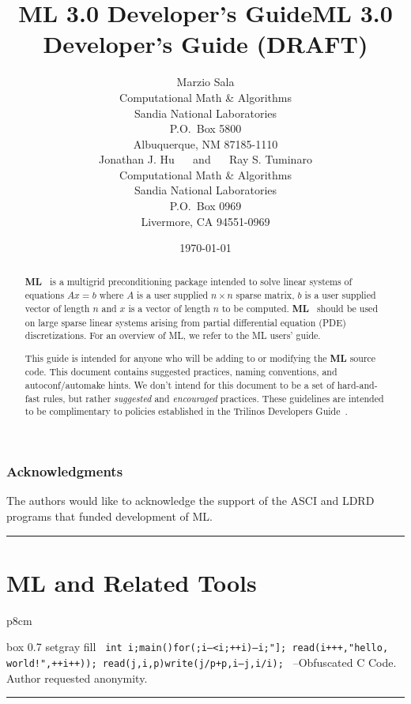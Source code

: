 \documentclass[10pt,letter,relax]{SANDreport}
\title{ML 3.0 Developer's Guide}
\title{ML 3.0 Developer's Guide (DRAFT)}
\author{
Marzio  Sala \\
Computational Math \& Algorithms \\
Sandia National Laboratories\\
P.O.~Box 5800 \\
Albuquerque, NM 87185-1110\\[20pt]
Jonathan J. Hu $\quad$ and $\quad$
Ray S. Tuminaro \\
Computational Math \& Algorithms \\
Sandia National Laboratories\\
P.O.~Box 0969 \\
Livermore, CA 94551-0969\\
}
\date{\today}
\newcommand{\HRule}{\noindent\rule{\linewidth}{1mm}}
\newcommand{\ML}     {{\bf ML }}
\begin{document}
\maketitle

\begin{abstract}
\ML\ is a multigrid preconditioning package intended to solve linear systems
 of equations $A x = b$ where $A$ is a user supplied $n \times n$ sparse
matrix, $b$ is a user supplied vector of length $n$ and $x$ is a vector of
length $n$ to be computed. \ML\ should be used on large sparse linear
systems arising from partial differential equation (PDE) discretizations.
For an overview of ML, we refer to the ML users' guide.

This guide is intended for anyone who will be adding to or modifying the \ML
source code.  This document contains suggested practices, naming conventions,
and autoconf/automake hints.  We don't intend for this document to be a set
of hard-and-fast rules, but rather {\em suggested} and {\em encouraged}
practices. These guidelines are intended to be complimentary to policies
established in the Trilinos Developers Guide~\cite{Trilinos-Dev-Guide}.
\end{abstract}

\clearpage

\section*{Acknowledgments}
The authors would like to acknowledge the support of the ASCI and LDRD 
programs that funded development of ML.

\clearpage

\SANDmain

\tableofcontents

\clearpage
\newpage


\vspace*{3cm}
\HRule
\part{ML and Related Tools}
\bigskip

\hfill
\begin{tabular}{p{8cm}}
\begin{boxitpara}{box 0.7 setgray fill}
{\tt
        int
        i;main(){for(;i--<i;++i){--i;}"]; read(i+++,"hello,
          world!",++i++));} read(j,i,p){write(j/p+p,i---j,i/i);}
}
--Obfuscated C Code. Author requested anonymity. 
\end{boxitpara}
\end{tabular}
\HRule
\end{document}

